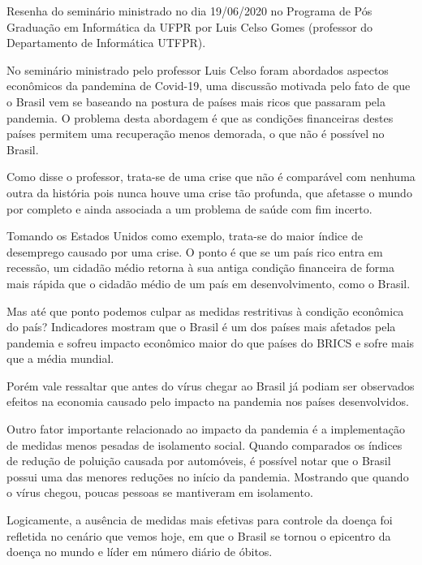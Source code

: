 
Resenha do seminário ministrado no dia 19/06/2020 no Programa de Pós Graduação em Informática da UFPR por Luis Celso Gomes (professor do Departamento de Informática UTFPR).

No seminário ministrado pelo professor Luis Celso foram abordados aspectos econômicos da pandemina de Covid-19, uma discussão motivada pelo fato de que o Brasil vem se baseando na postura de países mais ricos que passaram pela pandemia. O problema desta abordagem é que as condições financeiras destes países permitem uma recuperação menos demorada, o que não é possível no Brasil. 

Como disse o professor, trata-se de uma crise que não é comparável com nenhuma outra da história pois nunca houve uma crise tão profunda, que afetasse o mundo por completo e ainda associada a um problema de saúde com fim incerto. 

Tomando os Estados Unidos como exemplo, trata-se do maior índice de desemprego causado por uma crise. O ponto é que se um país rico entra em recessão, um cidadão médio retorna à sua antiga condição financeira de forma mais rápida que o cidadão médio de um país em desenvolvimento, como o Brasil.

Mas até que ponto podemos culpar as medidas restritivas à condição econômica do país? Indicadores mostram que o Brasil é um dos países mais afetados pela pandemia e sofreu impacto econômico maior do que países do BRICS e sofre mais que a média mundial.

Porém vale ressaltar que antes do vírus chegar ao Brasil já podiam ser observados efeitos na economia causado pelo impacto na pandemia nos países desenvolvidos. 

Outro fator importante relacionado ao impacto da pandemia é a implementação de medidas menos pesadas de isolamento social. Quando comparados os índices de redução de poluição causada por automóveis, é possível notar que o Brasil possui uma das menores reduções no início da pandemia. Mostrando que quando o vírus chegou, poucas pessoas se mantiveram em isolamento.

Logicamente, a ausência de medidas mais efetivas para controle da doença foi refletida no cenário que vemos hoje, em que o Brasil se tornou o epicentro da doença no mundo e líder em número diário de óbitos.

